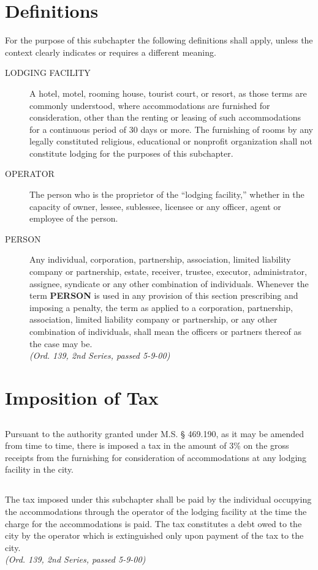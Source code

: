 \section{Definitions}
For the purpose of this subchapter the following definitions shall apply, unless the context clearly indicates or requires a different meaning.
\begin{description}
    \item[LODGING FACILITY] A hotel, motel, rooming house, tourist court, or resort, as those terms are commonly understood, where accommodations are furnished for consideration, other than the renting or leasing of such accommodations for a continuous period of 30 days or more.  The furnishing of rooms by any legally constituted religious, educational or nonprofit organization shall not constitute lodging for the purposes of this subchapter.
    \item[OPERATOR] The person who is the proprietor of the “lodging facility,” whether in the capacity of owner, lessee, sublessee, licensee or any officer, agent or employee of the person.
    \item[PERSON] Any individual, corporation, partnership, association, limited liability company or partnership, estate, receiver, trustee, executor, administrator, assignee, syndicate or any other combination of individuals.  Whenever the term \textbf{PERSON} is used in any provision of this section prescribing and imposing a penalty, the term as applied to a corporation, partnership, association, limited liability company or partnership, or any other combination of individuals, shall mean the officers or partners thereof as the case may be.\\
\emph{(Ord. 139, 2nd Series, passed 5-9-00)}
\end{description}
\section{Imposition of Tax}
\subsection{}
Pursuant to the authority granted under M.S. § 469.190, as it may be amended from time to time, there is imposed a tax in the amount of 3\% on the gross receipts from the furnishing for consideration of accommodations at any lodging facility in the city.
\subsection{}
The tax imposed under this subchapter shall be paid by the individual occupying the accommodations through the operator of the lodging facility at the time the charge for the accommodations is paid.  The tax constitutes a debt owed to the city by the operator which is extinguished only upon payment of the tax to the city.\\
\emph{(Ord. 139, 2nd Series, passed 5-9-00)}
